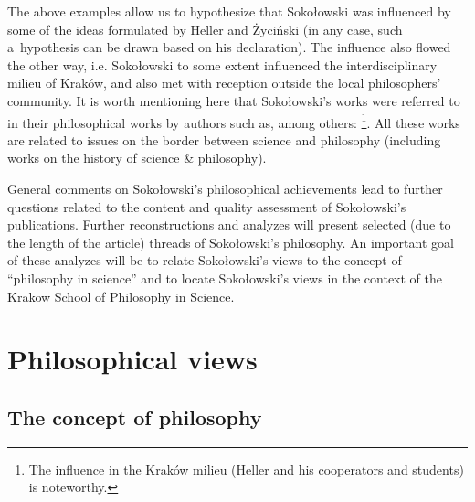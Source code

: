 \documentclass[%
  manuscript=article,
  year=2024,
  volume=77,
  doi=00000.000,
]{zfn}
\begin{document}
The above examples allow us to hypothesize that Sokołowski was influenced by some of the ideas formulated by Heller and Życiński (in any case, such a~hypothesis can be drawn based on his declaration). The influence also flowed the other way, i.e. Sokołowski to some extent influenced the interdisciplinary milieu of Kraków, and also met with reception outside the local philosophers' community. It is worth mentioning here that Sokołowski's works were referred to in their philosophical works by authors such as, among others: 
\parencites[][]{Burtyn1997Idea}[][]{Turek2005Filozofia}[][]{Jodkowski2007Spor}[][]{Filipek2008Elementy}[][]{Czerniawski2009Ruch}[][]{Czerniawski2012Protofizyka}[][]{}[][]{Grygiel2010Teoria}[][]{}[][]{}[][]{}[][]{Heller2013Filozofia}[][]{Heller2014Granice}[][]{Pabjan2013Filozoficzne}[][]{}[][]{}[][]{Janowski2016Zagadnienie}[][]{Janusz2017Stulecie}[][]{Jacyna2018Kosmologia}[][]{Sobkowiak2019Relacje}[][]{}[][]{Trombik2021Koncepcje}%
\footnote{The influence in the Kraków milieu (Heller and his cooperators and students) is noteworthy.}. All these works are related to issues on the border between science and philosophy (including works on the history of science \& philosophy).



General comments on Sokołowski's philosophical achievements lead to further questions related to the content and quality assessment of Sokołowski's publications. Further reconstructions and analyzes will present selected (due to the length of the article) threads of Sokołowski's philosophy. An important goal of these analyzes will be to relate Sokołowski's views to the concept of ``philosophy in science'' and to locate Sokołowski's views in the context of the Krakow School of Philosophy in Science.



\section{Philosophical views}

\subsection{ The concept of philosophy}
\end{document}
